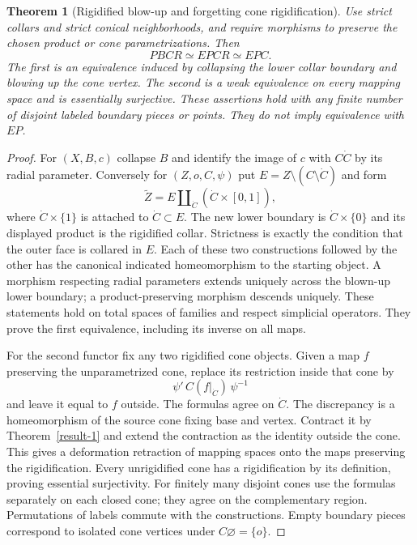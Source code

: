 \documentclass[11pt,a4paper]{article}
\newtheorem{theorem}{Theorem}[section]
\theoremstyle{definition}
\begin{document}
\begin{theorem}[Rigidified blow-up and forgetting cone rigidification]\label{result-6}
Use strict collars and strict conical neighborhoods, and require morphisms
to preserve the chosen product or cone parametrizations. Then
\[
 PBCR\simeq EPCR\simeq EPC.
\]
The first is an equivalence induced by collapsing the lower collar
boundary and blowing up the cone vertex. The second is a weak equivalence
on every mapping space and is essentially surjective. These assertions
hold with any finite number of disjoint labeled boundary pieces or points.
They do not imply equivalence with $EP$.
\end{theorem}
\begin{proof}
For $(X,B,c)$ collapse $B$ and identify the image of $c$ with
$C\dot C$ by its radial parameter. Conversely for $(Z,o,C,\psi)$ put
$E=Z\setminus(C\setminus\dot C)$ and form
\[
 \widetilde Z=E\amalg_{\dot C}(\dot C\times[0,1]),
\]
where $\dot C\times\{1\}$ is attached to $\dot C\subset E$.
The new lower boundary is $\dot C\times\{0\}$ and its displayed
product is the rigidified collar. Strictness is exactly the condition
that the outer face is collared in $E$. Each of these two constructions
followed by the other has the canonical indicated homeomorphism to the
starting object. A morphism respecting radial parameters extends
uniquely across the blown-up lower boundary; a product-preserving
morphism descends uniquely. These statements hold on total spaces of
families and respect simplicial operators. They prove the first
equivalence, including its inverse on all maps.

For the second functor fix any two rigidified cone objects. Given a map
$f$ preserving the unparametrized cone, replace its restriction inside
that cone by
\[
 \psi'\,C(f|_{\dot C})\,\psi^{-1}
\]
and leave it equal to $f$ outside. The formulas agree on $\dot C$.
The discrepancy is a homeomorphism of the source cone fixing base and
vertex. Contract it by Theorem~\ref{result-1} and extend the contraction as the identity
outside the cone. This gives a deformation retraction of mapping spaces
onto the maps preserving the rigidification. Every unrigidified cone has
a rigidification by its definition, proving essential surjectivity.
For finitely many disjoint cones use the formulas separately on each
closed cone; they agree on the complementary region. Permutations of
labels commute with the constructions. Empty boundary pieces correspond
to isolated cone vertices under $C\varnothing=\{o\}$.
\end{proof}
\end{document}
